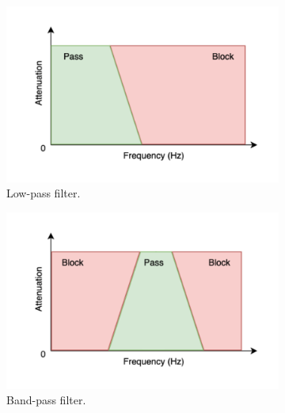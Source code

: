 \begin{figure}[ht]
    \centering
    \begin{subfigure}{0.45\textwidth}
        \centering
        \includegraphics[width=\textwidth]{../images/pipeline/lowpass_filter.pdf}
        \captionsetup{width=\linewidth}
        \captionsetup{justification=centering}
        \caption{Low-pass filter.}
        \label{fig:processing_signals_filters_lowpass}
    \end{subfigure}
    \hfill
    \begin{subfigure}{0.45\textwidth}
        \centering
        \includegraphics[width=\textwidth]{../images/pipeline/bandpass_filter.pdf}
        \captionsetup{width=\linewidth}
        \captionsetup{justification=centering}
        \caption{Band-pass filter.}
        \label{fig:processing_signals_filters_bandpass}
    \end{subfigure}
    \hfill
    \begin{subfigure}{0.45\textwidth}

\end{subfigure}
\end{figure}
